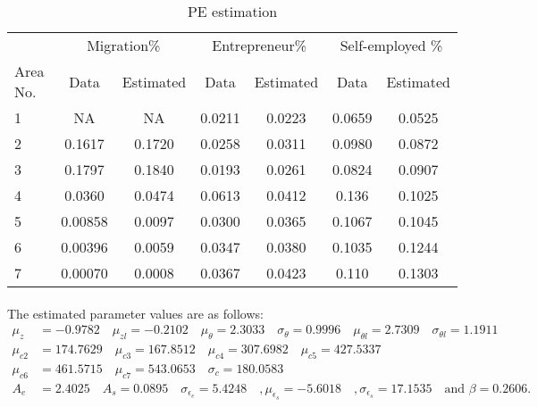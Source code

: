 \documentclass[12pt]{article}
\begin{document}
\begin{table}[H]
\caption{PE estimation\label{ass}}
\begin{center}
\begin{tabular}{lcccccc}
\hline
\hline
&\multicolumn {2}{c}{Migration\%}& \multicolumn{2}{c}{Entrepreneur\%}& \multicolumn {2}{c}{Self-employed \%} \\
Area No.& Data & Estimated  & Data & Estimated& Data & Estimated \\
\hline

1  &NA&NA & 0.0211 &0.0223 &0.0659 &0.0525 \\
    
2	&	0.1617&0.1720& 0.0258&0.0311&	0.0980&0.0872	 \\


3	&0.1797&0.1840& 	0.0193&0.0261&	0.0824	&0.0907 \\

4	&0.0360	&0.0474 &0.0613	&0.0412& 0.136	&0.1025 \\

5	& 0.00858&0.0097&	0.0300&0.0365	&0.1067&0.1045	\\

6	& 0.00396&0.0059&0.0347&0.0380&	0.1035&0.1244\\

7	& 0.00070	&0.0008&0.0367&0.0423	&0.110&	0.1303\\

\end{tabular}
\end{center}
\end{table}


\paragraph{}
The estimated parameter values are as follows:
\begin{align*}
\mu_z&=-0.9782  \quad \mu_{zl}=-0.2102  \quad \mu_{\theta}= 2.3033  \quad \sigma_{\theta}=0.9996 \quad   \mu_{\theta l}=2.7309 \quad \sigma_{\theta l}=1.1911\\
\mu_{c2}&=174.7629 \quad \mu_{c3}=167.8512 \quad \mu_{c4}= 307.6982 \quad \mu_{c5}=427.5337 \\
 \mu_{c6}&= 461.5715 \quad \mu_{c7}= 543.0653  \quad \sigma_c=180.0583  \\
A_e&=2.4025  \quad  A_s=0.0895 \quad    \sigma_{\epsilon_e}=5.4248 \quad, \mu_{\epsilon_s}=-5.6018 \quad, \sigma_{\epsilon_s}=17.1535 \quad \text{and } \beta=0.2606. 
\end{align*}
\end{document}
